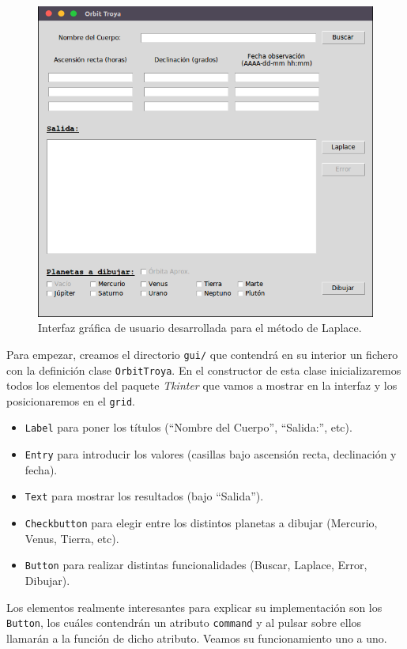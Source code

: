 \begin{figure}[H]
\centering
\includegraphics[scale=0.5]{images/gui.png}
\caption{Interfaz gráfica de usuario desarrollada para el método de Laplace.}
\label{fig:gui}
\end{figure}

Para empezar, creamos el directorio \texttt{gui/} que contendrá en su interior un fichero con la definición clase \texttt{OrbitTroya}. En el constructor de esta clase inicializaremos todos los elementos del paquete \textit{Tkinter} que vamos a mostrar en la interfaz y los posicionaremos en el \texttt{grid}.
\begin{itemize}
\item \texttt{Label} para poner los títulos (``Nombre del Cuerpo'', ``Salida:'', etc).
\item \texttt{Entry} para introducir los valores (casillas bajo ascensión recta, declinación y fecha).
\item \texttt{Text} para mostrar los resultados (bajo ``Salida'').
\item \texttt{Checkbutton} para elegir entre los distintos planetas a dibujar (Mercurio, Venus, Tierra, etc).
\item \texttt{Button} para realizar distintas funcionalidades (Buscar, Laplace, Error, Dibujar).
\end{itemize}

Los elementos realmente interesantes para explicar su implementación son los \texttt{Button}, los cuáles contendrán un atributo \texttt{command} y al pulsar sobre ellos llamarán a la función de dicho atributo. Veamos su funcionamiento uno a uno.\\

